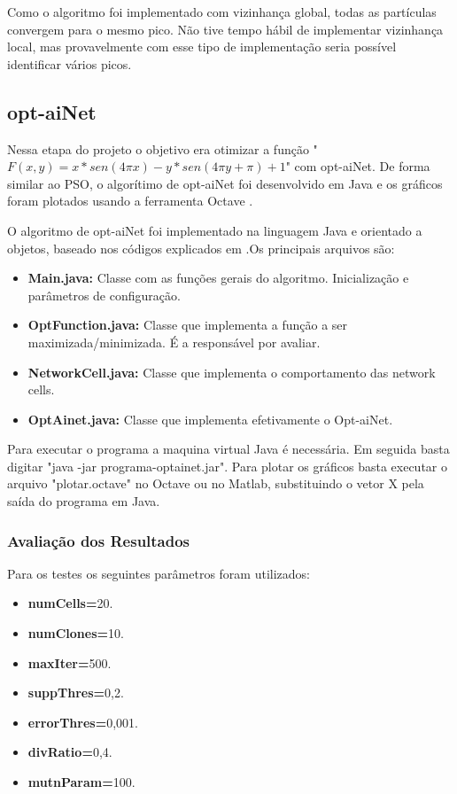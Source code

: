 \documentclass{acm_proc_article-sp}
\begin{document}
Como o algoritmo foi implementado com vizinhança global, todas as partículas convergem para o mesmo pico. Não tive tempo hábil de implementar vizinhança local, mas provavelmente com esse tipo de implementação seria possível identificar vários picos.

\subsection{opt-aiNet}
Nessa etapa do projeto o objetivo era otimizar a função "$\displaystyle F(x,y)=x * sen(4 \pi x) - y * sen(4 \pi y + \pi ) + 1$" com opt-aiNet. De forma similar ao PSO, o algorítimo de opt-aiNet foi desenvolvido em Java e os gráficos foram plotados usando a ferramenta Octave \cite{octave}.

O algoritmo de opt-aiNet foi implementado na linguagem Java e orientado a objetos, baseado nos códigos explicados em \cite{aisweb}.Os principais arquivos são:

\begin{itemize}
	\item \textbf{Main.java:} Classe com as funções gerais do algoritmo. Inicialização e parâmetros de configuração.	
	\item \textbf{OptFunction.java:} Classe que implementa a função a ser maximizada/minimizada. É a responsável por avaliar.
	\item \textbf{NetworkCell.java:} Classe que implementa o comportamento das network cells.
	\item \textbf{OptAinet.java:} Classe que implementa efetivamente o Opt-aiNet.
\end{itemize}

Para executar o programa a maquina virtual Java é necessária. Em seguida basta digitar "java -jar programa-optainet.jar". Para plotar os gráficos basta executar o arquivo "plotar.octave" no Octave ou no Matlab, substituindo o vetor X pela saída do programa em Java.

\subsubsection{Avaliação dos Resultados}
Para os testes os seguintes parâmetros foram utilizados:

\begin{itemize}
	\item \textbf{numCells=}20.	
	\item \textbf{numClones=}10.
	\item \textbf{maxIter=}500.
	\item \textbf{suppThres=}0,2.
	\item \textbf{errorThres=}0,001.
	\item \textbf{divRatio=}0,4.
	\item \textbf{mutnParam=}100.	
\end{itemize}
\end{document}

